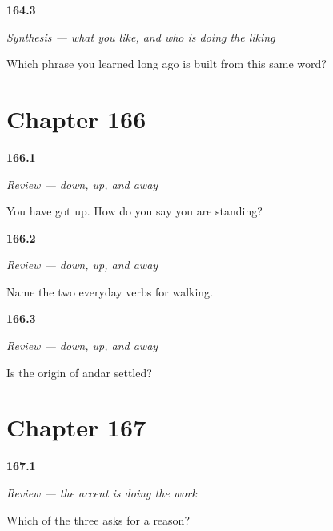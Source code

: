 \noindent\begin{minipage}[t]{\linewidth}
\raggedright
\hypertarget{review-ES-C35-sintesis-gustar-joke}{\textbf{164.3}} \emph{Synthesis — what you like, and who is doing the liking}\par
\small Which phrase you learned long ago is built from this same word?
\end{minipage}\par\medskip

\section*{Chapter 166}

\noindent\begin{minipage}[t]{\linewidth}
\raggedright
\hypertarget{review-ES-C37-repaso-sentado-de-pie-andando-depie}{\textbf{166.1}} \emph{Review — down, up, and away}\par
\small You have got up. How do you say you are standing?
\end{minipage}\par\medskip

\noindent\begin{minipage}[t]{\linewidth}
\raggedright
\hypertarget{review-ES-C37-repaso-sentado-de-pie-andando-andar}{\textbf{166.2}} \emph{Review — down, up, and away}\par
\small Name the two everyday verbs for walking.
\end{minipage}\par\medskip

\noindent\begin{minipage}[t]{\linewidth}
\raggedright
\hypertarget{review-ES-C37-repaso-sentado-de-pie-andando-origen}{\textbf{166.3}} \emph{Review — down, up, and away}\par
\small Is the origin of andar settled?
\end{minipage}\par\medskip

\section*{Chapter 167}

\noindent\begin{minipage}[t]{\linewidth}
\raggedright
\hypertarget{review-ES-C38-repaso-los-tres-porques-ask}{\textbf{167.1}} \emph{Review — the accent is doing the work}\par
\small Which of the three asks for a reason?
\end{minipage}\par\medskip


